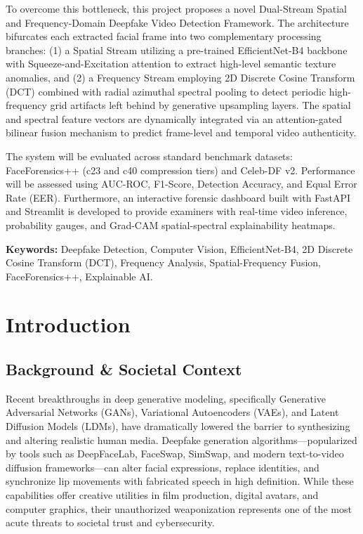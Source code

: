 \documentclass[12pt,a4paper]{report}
\begin{document}
\vspace{0.3cm}
To overcome this bottleneck, this project proposes a novel Dual-Stream Spatial and Frequency-Domain Deepfake Video Detection Framework. The architecture bifurcates each extracted facial frame into two complementary processing branches: (1) a Spatial Stream utilizing a pre-trained EfficientNet-B4 backbone with Squeeze-and-Excitation attention to extract high-level semantic texture anomalies, and (2) a Frequency Stream employing 2D Discrete Cosine Transform (DCT) combined with radial azimuthal spectral pooling to detect periodic high-frequency grid artifacts left behind by generative upsampling layers. The spatial and spectral feature vectors are dynamically integrated via an attention-gated bilinear fusion mechanism to predict frame-level and temporal video authenticity.

\vspace{0.3cm}
The system will be evaluated across standard benchmark datasets: FaceForensics++ (c23 and c40 compression tiers) and Celeb-DF v2. Performance will be assessed using AUC-ROC, F1-Score, Detection Accuracy, and Equal Error Rate (EER). Furthermore, an interactive forensic dashboard built with FastAPI and Streamlit is developed to provide examiners with real-time video inference, probability gauges, and Grad-CAM spatial-spectral explainability heatmaps.

\vspace{0.5cm}
\noindent
\textbf{Keywords:} Deepfake Detection, Computer Vision, EfficientNet-B4, 2D Discrete Cosine Transform (DCT), Frequency Analysis, Spatial-Frequency Fusion, FaceForensics++, Explainable AI.

\newpage

\tableofcontents
\newpage


\chapter{Introduction}

\section{Background \& Societal Context}
Recent breakthroughs in deep generative modeling, specifically Generative Adversarial Networks (GANs), Variational Autoencoders (VAEs), and Latent Diffusion Models (LDMs), have dramatically lowered the barrier to synthesizing and altering realistic human media. Deepfake generation algorithms---popularized by tools such as DeepFaceLab, FaceSwap, SimSwap, and modern text-to-video diffusion frameworks---can alter facial expressions, replace identities, and synchronize lip movements with fabricated speech in high definition. While these capabilities offer creative utilities in film production, digital avatars, and computer graphics, their unauthorized weaponization represents one of the most acute threats to societal trust and cybersecurity.
\end{document}
